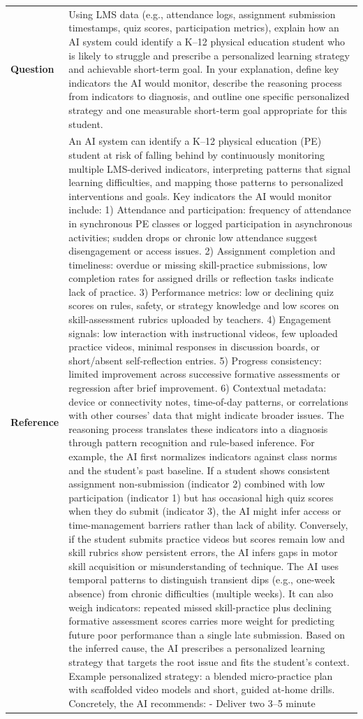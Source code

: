 \begin{longtable}{@{}l p{12.5cm}@{}}
  \textbf{Question} & Using LMS data (e.g., attendance logs, assignment submission timestamps, quiz scores, participation metrics), explain how an AI system could identify a K--12 physical education student who is likely to struggle and prescribe a personalized learning strategy and achievable short-term goal. In your explanation, define key indicators the AI would monitor, describe the reasoning process from indicators to diagnosis, and outline one specific personalized strategy and one measurable short-term goal appropriate for this student. \\
  \textbf{Reference} & An AI system can identify a K--12 physical education (PE) student at risk of falling behind by continuously monitoring multiple LMS-derived indicators, interpreting patterns that signal learning difficulties, and mapping those patterns to personalized interventions and goals. Key indicators the AI would monitor include: 1) Attendance and participation: frequency of attendance in synchronous PE classes or logged participation in asynchronous activities; sudden drops or chronic low attendance suggest disengagement or access issues. 2) Assignment completion and timeliness: overdue or missing skill-practice submissions, low completion rates for assigned drills or reflection tasks indicate lack of practice. 3) Performance metrics: low or declining quiz scores on rules, safety, or strategy knowledge and low scores on skill-assessment rubrics uploaded by teachers. 4) Engagement signals: low interaction with instructional videos, few uploaded practice videos, minimal responses in discussion boards, or short/absent self-reflection entries. 5) Progress consistency: limited improvement across successive formative assessments or regression after brief improvement. 6) Contextual metadata: device or connectivity notes, time-of-day patterns, or correlations with other courses' data that might indicate broader issues. The reasoning process translates these indicators into a diagnosis through pattern recognition and rule-based inference. For example, the AI first normalizes indicators against class norms and the student's past baseline. If a student shows consistent assignment non-submission (indicator 2) combined with low participation (indicator 1) but has occasional high quiz scores when they do submit (indicator 3), the AI might infer access or time-management barriers rather than lack of ability. Conversely, if the student submits practice videos but scores remain low and skill rubrics show persistent errors, the AI infers gaps in motor skill acquisition or misunderstanding of technique. The AI uses temporal patterns to distinguish transient dips (e.g., one-week absence) from chronic difficulties (multiple weeks). It can also weigh indicators: repeated missed skill-practice plus declining formative assessment scores carries more weight for predicting future poor performance than a single late submission. Based on the inferred cause, the AI prescribes a personalized learning strategy that targets the root issue and fits the student's context. Example personalized strategy: a blended micro-practice plan with scaffolded video models and short, guided at-home drills. Concretely, the AI recommends: - Deliver two 3--5 minute 
\end{longtable}
